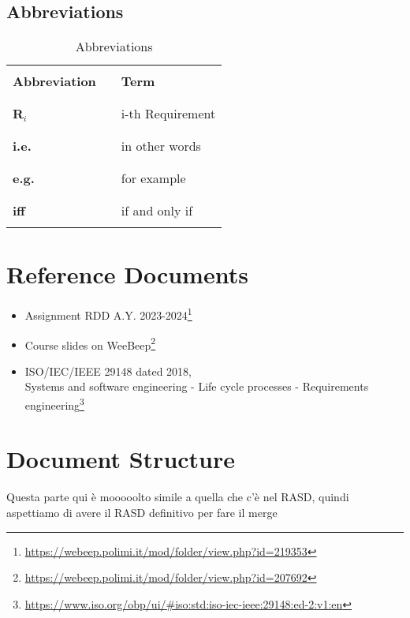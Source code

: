 \subsection{Abbreviations}
\begin{table}[H]
    \centering
    \renewcommand{\arraystretch}{0.5}
    \begin{tabular}{l l p{10.5cm}}
        \hline
                              &        &                        \\
        \textbf{Abbreviation} & \vline & \textbf{Term}          \\
                              &        &                        \\\hline & & \\
        \textbf{R}\(_i\)      & \vline & i-th Requirement       \\
                              &        &                        \\\hline & & \\
        \textbf{i.e.}         & \vline & in other words         \\
                              &        &                        \\\hline & & \\
        \textbf{e.g.}         & \vline & for example            \\
                              &        &                        \\\hline & & \\
        \textbf{iff}          & \vline & if and only if         \\
                              &        &                        \\
        \hline
    \end{tabular}
    \caption{Abbreviations}
\end{table}

\section{Reference Documents}
\begin{itemize}
    \item Assignment RDD A.Y. 2023-2024\footnote{\url{https://webeep.polimi.it/mod/folder/view.php?id=219353}}
    \item Course slides on WeeBeep\footnote{\url{https://webeep.polimi.it/mod/folder/view.php?id=207692}}
    \item ISO/IEC/IEEE 29148 dated 2018, \\
          Systems and software engineering - Life cycle processes - Requirements engineering\footnote{\url{https://www.iso.org/obp/ui/\#iso:std:iso-iec-ieee:29148:ed-2:v1:en}}
\end{itemize}

\section{Document Structure}

{\color{red} Questa parte qui è mooooolto simile a quella che c'è nel RASD, quindi aspettiamo di avere il RASD definitivo per fare il merge}
